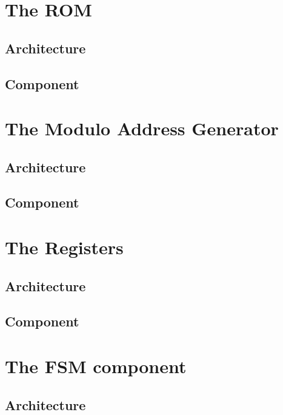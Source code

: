\documentclass[11pt]{article}
\begin{document}
\newpage
\appendix

\section{The ROM}
\subsection{Architecture}
\label{romarchi}

\subsection{Component}
\label{romcomp}

\newpage
\section{The Modulo Address Generator}
\subsection{Architecture}
\label{modumloaddressarchi}

\subsection{Component}
\label{modulocompcomp}


\newpage
\section{The Registers}
\subsection{Architecture}
\label{romarchi}

\subsection{Component}
\label{romcomp}


\newpage
\section{The FSM component}
\subsection{Architecture}
\label{romarchi}
\end{document}
